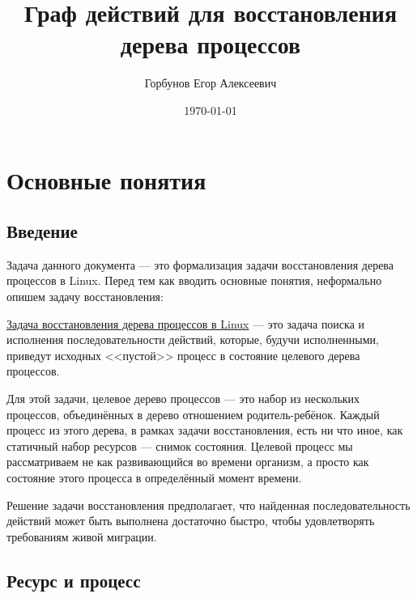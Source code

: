 
\title{Граф действий для восстановления дерева процессов}
\author{Горбунов Егор Алексеевич}
\date{\today}

\newcommand{\crcreate}[3]{\textit{CreateAction}($#1$, $#2$, $#3$)}
\newcommand{\crshare}[4]{\textit{ShareAction}($#1, #2, #3, #4$)}
\newcommand{\crinher}[2]{\textit{InheritProperty}($#1, #2$)}
\newcommand{\crdepend}[2]{\textit{DependsProperty}($#1, #2$)}
\newcommand{\crremove}[3]{\textit{RemoveAction}($#1, #2, #3$)}



\maketitle

\section{Основные понятия}

\subsection{Введение}

Задача данного документа --- это формализация задачи восстановления дерева процессов в Linux. Перед тем как вводить основные понятия, неформально опишем задачу восстановления:

\underline{Задача восстановления дерева процессов в Linux} --- это задача поиска и исполнения последовательности действий, которые, будучи исполненными, приведут исходных <<пустой>> процесс в состояние целевого дерева процессов.

Для этой задачи, целевое дерево процессов --- это набор из нескольких процессов, объединённых в дерево отношением родитель-ребёнок. Каждый процесс из этого дерева, в рамках задачи восстановления, есть ни что иное, как статичный набор ресурсов --- снимок состояния. Целевой процесс мы рассматриваем не как развивающийся во времени организм, а просто как состояние этого процесса в определённый момент времени.

Решение задачи восстановления предполагает, что найденная последовательность действий может быть выполнена достаточно быстро, чтобы удовлетворять требованиям живой миграции.

\subsection{Ресурс и процесс}

